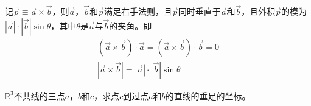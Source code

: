 \begin{theorem}
  记$\vec p\equiv\vec a\times \vec b$，则$\vec a$，$\vec b$和$\vec p$满足右手法则，且$\vec p$同时垂直于$\vec a$和$\vec b$，且外积$\vec p$的模为$\left|\vec a\right|\cdot\left|\vec b\right|\sin\theta$，其中$\theta$是$\vec a$与$\vec b$的夹角。即
  \begin{gather*}
    (\vec a\times \vec b)\cdot \vec a = (\vec a\times \vec b)\cdot \vec b = 0\\
    \left| \vec a\times \vec b\right| = \left| \vec a\right| \cdot \left| \vec b\right| \sin\theta
  \end{gather*}
\end{theorem}


\begin{example}[垂足坐标]
  $\mathbb{R}^3$不共线的三点$a$，$b$和$c$，求点$c$到过点$a$和$b$的直线的垂足的坐标。
\end{example}

